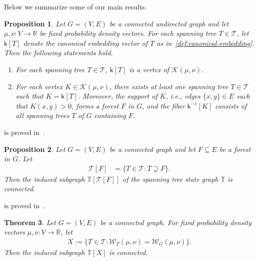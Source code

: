 \documentclass[11pt,a4paper]{article}
\newcommand{\wass}{{\mathcal{W}}}
\newcommand{\setoftrees}{{\mathcal{T}}}
\newcommand{\stategraph}{{\mathbb{T}}}
\newcommand{\embedding}{{\mathsf{k}}}
\newcommand{\flowpoly}{{\mathcal{K}}}
\newtheorem{theorem}{Theorem}[section]
\newtheorem{proposition}[theorem]{Proposition}
\begin{document}
    Below we summarize some of our main results. 

    \begin{proposition}\label{prop:intro-vertices-of-polytope}
        Let $G=(V,E)$ be a connected undirected graph and let $\mu,\nu:V\to\mathbb{R}$ be fixed probability density vectors. For each spanning tree $T\in\setoftrees$, let $\embedding[T]$ denote the canonical embedding vector of $T$ as in~\cref{def:canonical-embedding}. Then the following statements hold.
            \begin{enumerate}[label=(\roman*)]
                \item For each spanning tree $T\in\setoftrees$, $\embedding[T]$ is a vertex of $\flowpoly(\mu,\nu)$.
                \item For each vertex $K\in\flowpoly(\mu,\nu)$, there exists at least one spanning tree $T\in\setoftrees$ such that $K = \embedding[T]$. Moreover, the support of $K$, i.e., edges $\{x,y\}\in E$ such that $K(x,y)>0$, forms a forest $F$ in $G$, and the fiber $\embedding^{-1}[K]$ consists of all spanning trees $T$ of $G$ containing $F$.
            \end{enumerate}
    \end{proposition}

     is proved in~.

    \begin{proposition}\label{prop:intro-connected-fibers}
        Let $G=(V,E)$ be a connected graph and let $F\subseteq E$ be a forest in $G$. Let
            \begin{align*}
                \setoftrees[F] &= \{T\in\setoftrees : T\supseteq F\}.
            \end{align*}
        Then the induced subgraph $\stategraph[\setoftrees[F]]$ of the spanning tree state graph $\stategraph$ is connected.
    \end{proposition}

     is proved in~.

    \begin{theorem}\label{thm:intro-connectivity}
        Let $G=(V,E)$ be a connected graph. For fixed probability density vectors $\mu,\nu:V\to\mathbb{R}$, let
            \begin{align*}
                X := \{T\in\setoftrees : \wass_T(\mu,\nu)=\wass_G(\mu,\nu)\}.
            \end{align*}
        Then the induced subgraph $\stategraph[X]$ is connected.
    \end{theorem}
\end{document}
